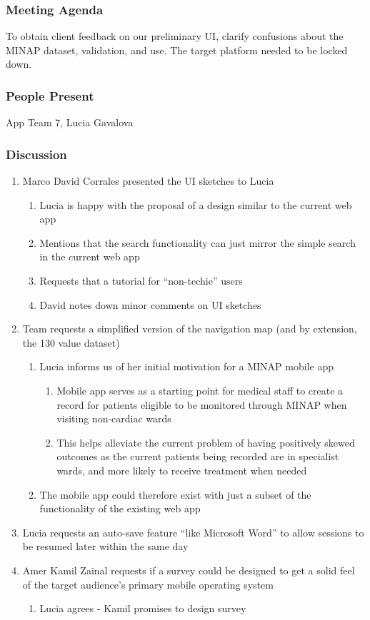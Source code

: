 \documentclass[12pt,a4paper,oneside,titlepage]{article}
\begin{document}
\subsubsection{Meeting Agenda}
To obtain client feedback on our preliminary UI, clarify confusions about the MINAP dataset, validation, and use. The target platform needed to be locked down.
\subsubsection{People Present}
App Team 7, Lucia Gavalova
\subsubsection{Discussion}
\begin{enumerate}
	\item Marco David Corrales presented the UI sketches to Lucia 
	\begin{enumerate}
	\item Lucia is happy with the proposal of a design similar to the current web app
	\item Mentions that the search functionality can just mirror the simple search in the current web app
	\item Requests that a tutorial for “non-techie” users 
	\item David notes down minor comments on UI sketches 
	\end{enumerate}
	\item Team requests a simplified version of the navigation map (and by extension, the 130 value dataset)
	\begin{enumerate}
	\item Lucia informs us of her initial motivation for a MINAP mobile app 
	\begin{enumerate}
		\item Mobile app serves as a starting point for medical staff to create a record for patients eligible to be monitored through MINAP when visiting non-cardiac wards 
		\item This helps alleviate the current problem of having positively skewed outcomes as the current patients being recorded are in specialist wards, and more likely to receive treatment when needed 
	\end{enumerate}
	\item The mobile app could therefore exist with just a subset of the functionality of the existing web app 
	\end{enumerate}
	\item Lucia requests an auto-save feature “like Microsoft Word” to allow sessions to be resumed later within the same day 
	\item Amer Kamil Zainal requests if a survey could be designed to get a solid feel of the target audience’s primary mobile operating system 
	\begin{enumerate}
	\item Lucia agrees - Kamil promises to design survey
	\end{enumerate}
\end{enumerate}
\end{document}
